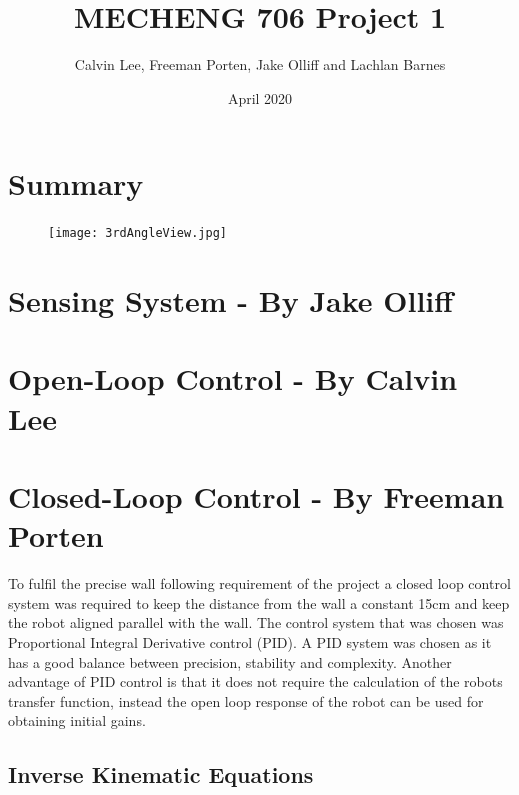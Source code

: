 \documentclass[11pt]{article}
\title{MECHENG 706 Project 1}
\author{Calvin Lee, Freeman Porten, Jake Olliff and Lachlan Barnes}
\date{April 2020}
\begin{document}
\maketitle

\section{Summary}
\begin{figure}[htbp]
    \centering
    \texttt{[image: 3rdAngleView.jpg]}
    \caption{}
    \label{fig:3rdAngleRobot}
\end{figure}
\section{Sensing System - By Jake Olliff}

\section{Open-Loop Control - By Calvin Lee}

\newpage
\section{Closed-Loop Control - By Freeman Porten}

\par To fulfil the precise wall following requirement of the project a closed loop control system was required to keep the distance from the wall a constant 15cm and keep the robot aligned parallel with the wall. The control system that was chosen was Proportional Integral Derivative control (PID). A PID system was chosen as it has a good balance between precision, stability and complexity. Another advantage of PID control is that it does not require the calculation of the robots transfer function, instead the open loop response of the robot can be used for obtaining initial gains.

\subsection{Inverse Kinematic Equations} \label{sec:KinematicEquations}
\end{document}
